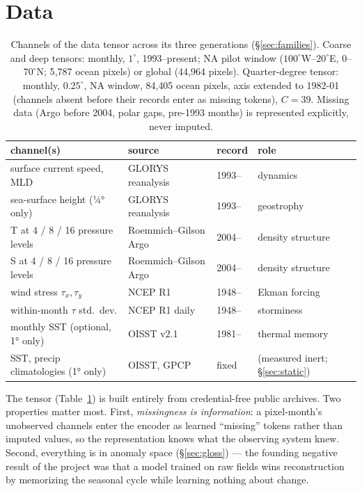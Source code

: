 \documentclass[10pt]{article}
\begin{document}
\section{Data}\label{sec:data}

\begin{table}[t]
\centering\small
\begin{tabular}{llll}
\toprule
channel(s) & source & record & role \\
\midrule
surface current speed, MLD & GLORYS reanalysis & 1993-- & dynamics \\
sea-surface height (¼° only) & GLORYS reanalysis & 1993-- & geostrophy \\
T at 4 / 8 / 16 pressure levels & Roemmich--Gilson Argo & 2004-- & density structure \\
S at 4 / 8 / 16 pressure levels & Roemmich--Gilson Argo & 2004-- & density structure \\
wind stress $\tau_x,\tau_y$ & NCEP R1 & 1948-- & Ekman forcing \\
within-month $\tau$ std.\ dev. & NCEP R1 daily & 1948-- & storminess \\
monthly SST (optional, 1° only) & OISST v2.1 & 1981-- & thermal memory \\
SST, precip climatologies (1° only) & OISST, GPCP & fixed & (measured inert; \S\ref{sec:static}) \\
\bottomrule
\end{tabular}
\caption{Channels of the data tensor across its three generations
(\S\ref{sec:families}). Coarse and deep tensors: monthly, $1^\circ$,
1993--present; NA pilot window
($100^\circ$W--$20^\circ$E, $0$--$70^\circ$N; 5{,}787 ocean pixels) or
global (44{,}964 pixels). Quarter-degree tensor: monthly,
$0.25^\circ$, NA window, 84{,}405 ocean pixels, axis extended to
1982-01 (channels absent before their records enter as missing
tokens), $C{=}39$. Missing data (Argo before 2004, polar gaps,
pre-1993 months) is represented explicitly, never imputed.}
\label{tab:channels}
\end{table}

The tensor (Table~\ref{tab:channels}) is built entirely from
credential-free public archives. Two properties matter most. First,
\emph{missingness is information}: a pixel-month's unobserved channels
enter the encoder as learned ``missing'' tokens rather than imputed
values, so the representation knows what the observing system knew.
Second, everything is in anomaly space (\S\ref{sec:gloss}) --- the
founding negative result of the project was that a model trained on raw
fields wins reconstruction by memorizing the seasonal cycle while
learning nothing about change.
\end{document}
